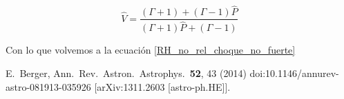 \documentclass[12pt,a4paper]{book}
\begin{document}
\begin{equation}
\hat { V } = \frac { ( \Gamma + 1 ) + ( \Gamma - 1 ) \hat { P } } { ( \Gamma + 1 ) \hat { P } + ( \Gamma - 1 ) }
\end{equation}

Con lo que volvemos a la ecuación \ref{RH_no_rel_choque_no_fuerte}

\begin{thebibliography}{20}


  E.~Berger,
  Ann.\ Rev.\ Astron.\ Astrophys.\  {\bf 52}, 43 (2014)
  doi:10.1146/annurev-astro-081913-035926
  [arXiv:1311.2603 [astro-ph.HE]].
 

 
\end{thebibliography}
\end{document}
